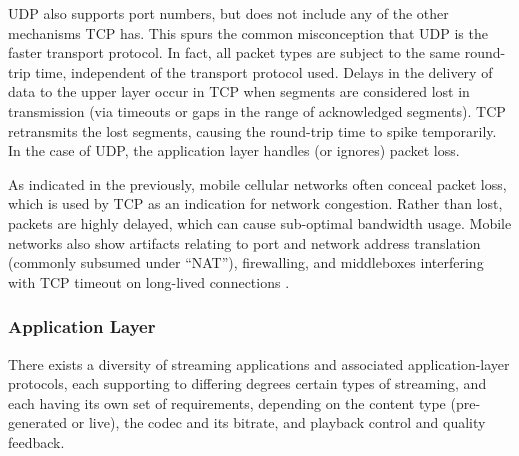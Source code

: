 UDP also supports port numbers, but does not include any of the other mechanisms TCP has. This spurs the common misconception that UDP is the faster transport protocol. In fact, all packet types are subject to the same round-trip time, independent of the transport protocol used. Delays in the delivery of data to the upper layer occur in TCP when segments are considered lost in transmission (via timeouts or gaps in the range of acknowledged segments). TCP retransmits the lost segments, causing the round-trip time to spike temporarily. In the case of UDP, the application layer handles (or ignores) packet loss.

As indicated in the previously, mobile cellular networks often conceal packet loss, which is used by TCP as an indication for network congestion. Rather than lost, packets are highly delayed, which can cause sub-optimal bandwidth usage. Mobile networks also show artifacts relating to port and network address translation (commonly subsumed under ``NAT''), firewalling, and middleboxes interfering with TCP timeout on long-lived connections \cite{sigcomm11middleboxes}.


%




\subsubsection{Application Layer}

There exists a diversity of streaming applications and associated application-layer protocols, each supporting to differing degrees certain types of streaming, and each having its own set of requirements, depending on the content type (pre-generated or live), the codec and its bitrate, and playback control and quality feedback.

